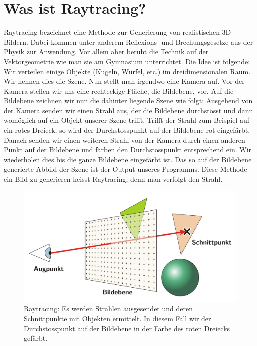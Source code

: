 \documentclass[12pt,a4paper]{article}
\theoremstyle{definition}
\theoremstyle{definition}
\begin{document}
	\section*{Was ist Raytracing?}
	Raytracing bezeichnet eine Methode zur Generierung von realistischen 3D Bildern.
	Dabei kommen unter anderem Reflexions- und Brechungsgesetze aus der Physik zur Anwendung.
	Vor allem aber beruht die Technik auf der Vektorgeometrie wie man sie am Gymnasium unterrichtet.
	Die Idee ist folgende: Wir verteilen einige Objekte (Kugeln, Würfel, etc.) im dreidimensionalen Raum.
	Wir nennen dies die Szene.
	Nun stellt man irgendwo eine Kamera auf.
	Vor der Kamera stellen wir uns eine rechteckige Fläche, die Bildebene, vor.
	Auf die Bildebene zeichnen wir nun die dahinter liegende Szene wie folgt:
	Ausgehend von der Kamera senden wir einen Strahl aus, der die Bildebene durchstösst und dann womöglich auf ein Objekt unserer Szene trifft.
	Trifft der Strahl zum Beispiel auf ein rotes Dreieck, so wird der Durchstosspunkt auf der Bildebene rot eingefärbt.
	Danach senden wir einen weiteren Strahl von der Kamera durch einen anderen Punkt auf der Bildebene und färben den Durchstosspunkt entsprechend ein.
	Wir wiederholen dies bis die ganze Bildebene eingefärbt ist.
	Das so auf der Bildebene generierte Abbild der Szene ist der Output unseres Programms.
	Diese Methode ein Bild zu generieren heisst Raytracing, denn man verfolgt den Strahl.
	\begin{figure}[h!]
		\centering
		\includegraphics[width=\textwidth]{images/raytracing.png}
		\caption{Raytracing: Es werden Strahlen ausgesendet und deren Schnittpunkte mit Objekten ermittelt. In diesem Fall wir der Durchstosspunkt auf der Bildebene in der Farbe des roten Dreiecks gefärbt.}
		\label{fig:raytracing}
	\end{figure}
\end{document}

